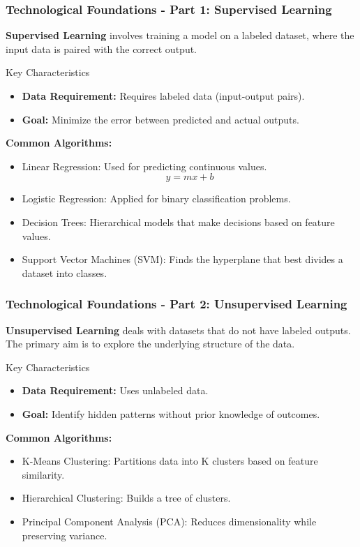\documentclass[aspectratio=169]{beamer}
\begin{document}
\begin{frame}[fragile]
    \frametitle{Technological Foundations - Part 1: Supervised Learning}
    \textbf{Supervised Learning} involves training a model on a labeled dataset, where the input data is paired with the correct output.

    \begin{block}{Key Characteristics}
        \begin{itemize}
            \item \textbf{Data Requirement:} Requires labeled data (input-output pairs).
            \item \textbf{Goal:} Minimize the error between predicted and actual outputs.
        \end{itemize}
    \end{block}

    \textbf{Common Algorithms:}
    \begin{itemize}
        \item Linear Regression: Used for predicting continuous values.\\
              \begin{equation}
              y = mx + b
              \end{equation}
        \item Logistic Regression: Applied for binary classification problems.
        \item Decision Trees: Hierarchical models that make decisions based on feature values.
        \item Support Vector Machines (SVM): Finds the hyperplane that best divides a dataset into classes.
    \end{itemize}
\end{frame}

\begin{frame}[fragile]
    \frametitle{Technological Foundations - Part 2: Unsupervised Learning}
    \textbf{Unsupervised Learning} deals with datasets that do not have labeled outputs. The primary aim is to explore the underlying structure of the data.

    \begin{block}{Key Characteristics}
        \begin{itemize}
            \item \textbf{Data Requirement:} Uses unlabeled data.
            \item \textbf{Goal:} Identify hidden patterns without prior knowledge of outcomes.
        \end{itemize}
    \end{block}

    \textbf{Common Algorithms:}
    \begin{itemize}
        \item K-Means Clustering: Partitions data into K clusters based on feature similarity.
        \item Hierarchical Clustering: Builds a tree of clusters.
        \item Principal Component Analysis (PCA): Reduces dimensionality while preserving variance.
    \end{itemize}
\end{frame}
\end{document}
